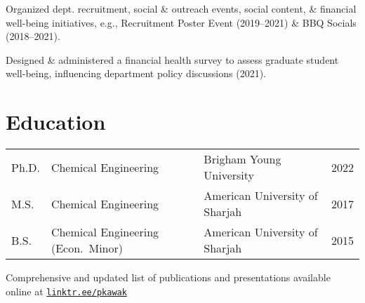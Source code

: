 \documentclass[letterpaper,12pt]{article}
\begin{document}
\begin{tabitemize}
  \item Organized dept. recruitment, social \& outreach events, social content, \& financial well-being initiatives, e.g., Recruitment Poster Event (2019–2021) \& BBQ Socials (2018–2021).
  \item Designed \& administered a financial health survey to assess graduate student well-being, influencing department policy discussions (2021).
\end{tabitemize}

\vspace{-1.5\baselineskip}
\section*{Education}%
\vspace{-0.3\baselineskip}
\begin{tabular}{@{}p{} p{} p{} r@{}}
  Ph.D.   & Chemical Engineering        & Brigham Young University       & 2022 \\ %
  M.S.    &  Chemical Engineering       & American University of Sharjah & 2017 \\ %
  B.S.    & Chemical Engineering (Econ.~Minor) & American University of Sharjah & 2015 \\ %
\end{tabular}

\begin{center}
  \begin{footnotesize}
    Comprehensive and updated list of publications and presentations available online at \href{https://linktr.ee/pkawak}{\tt linktr.ee/pkawak}\\
  \end{footnotesize}
\end{center}
\end{document}
